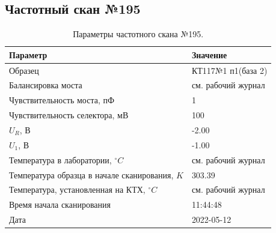 \subsection{Частотный скан №195}
\begin{table}[!ht]
    \centering
    \caption{Параметры частотного скана №195.}
    \begin{tabular}{|l|l|}
        \hline
        Параметр                                       & Значение                  \\ \hline
        Образец                                        & КТ117№1 п1(база 2)        \\ \hline
        Балансировка моста                             & см. рабочий журнал        \\ \hline
        Чувствительность моста, пФ                     & 1                         \\ \hline
        Чувствительность селектора, мВ                 & 100                       \\ \hline
        $U_R$, В                                       & -2.00                     \\ \hline
        $U_1$, В                                       & -1.00                     \\ \hline
        Температура в лаборатории, $^\circ C$          & см. рабочий журнал        \\ \hline
        Температура образца в начале сканирования, $K$ & 303.39                    \\ \hline
        Температура, установленная на КТХ, $^\circ C$  & см. рабочий журнал        \\ \hline
        Время начала сканирования                      & 11:44:48                  \\ \hline
        Дата                                           & 2022-05-12                \\ \hline
    \end{tabular}
    \label{table:frequency_scan_195}
\end{table}

